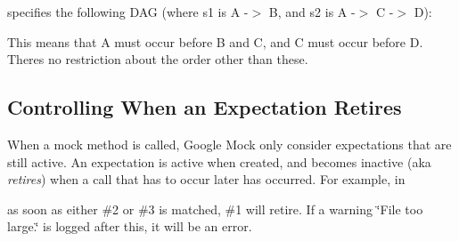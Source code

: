 \begin{DoxyCode}{0}
\DoxyCodeLine{}
\DoxyCodeLine{}
\end{DoxyCode}


specifies the following D\+AG (where {\ttfamily s1} is {\ttfamily A -\/$>$ B}, and {\ttfamily s2} is {\ttfamily A -\/$>$ C -\/$>$ D})\+:


\begin{DoxyCode}{0}
\DoxyCodeLine{     |}
\DoxyCodeLine{     |}
\end{DoxyCode}


This means that A must occur before B and C, and C must occur before D. There\textquotesingle{}s no restriction about the order other than these.

\subsection*{Controlling When an Expectation Retires}

When a mock method is called, Google Mock only consider expectations that are still active. An expectation is active when created, and becomes inactive (aka {\itshape retires}) when a call that has to occur later has occurred. For example, in


\begin{DoxyCode}{0}
\DoxyCodeLine{}
\DoxyCodeLine{}
\end{DoxyCode}


as soon as either \#2 or \#3 is matched, \#1 will retire. If a warning {\ttfamily \char`\"{}\+File too large.\char`\"{}} is logged after this, it will be an error.

